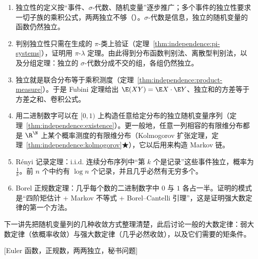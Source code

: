
\begin{enumerate}
\item 独立性的定义按“事件、$\sigma$-代数、随机变量”逐步推广；多个事件的独立性要求一切子族的乘积公式，两两独立不够（）。$\sigma$-代数是信息，独立的随机变量的函数仍然独立。
\item 判别独立性只需在生成的 $\pi$-类上验证（定理~\ref{thm:independence:pi-systems}），证明用 $\pi$-$\lambda$ 定理。由此得到分布函数判别法、离散型判别法，以及分组定理：独立的 $\sigma$-代数分成不交的组，各组仍然独立。
\item 独立就是联合分布等于乘积测度（定理~\ref{thm:independence:product-measure}）。于是 Fubini 定理给出 $\E(XY)=\E X\cdot \E Y$、独立和的方差等于方差之和、卷积公式。
\item 用二进制数字可以在 $[0,1)$ 上构造任意给定分布的独立随机变量序列（定理~\ref{thm:independence:existence}）。更一般地，任意一列相容的有限维分布都是 $\R^\N$ 上某个概率测度的有限维分布（Kolmogorov 扩张定理，定理~\ref{thm:independence:kolmogorov}★），它以后用来构造 Markov 链。
\item Rényi 记录定理：i.i.d. 连续分布序列中“第 $k$ 个是记录”这些事件独立，概率为 $\frac1k$。前 $n$ 个中约有 $\log n$ 个记录，并且几乎必然有无穷多个。
\item Borel 正规数定理：几乎每个数的二进制数字中 $0$ 与 $1$ 各占一半。证明的模式是“四阶矩估计 + Markov 不等式 + Borel--Cantelli 引理”，这是证明强大数定律的第一个方法。
\end{enumerate}
下一讲先把随机变量列的几种收敛方式整理清楚，此后讨论一般的大数定律：弱大数定律（依概率收敛）与强大数定律（几乎必然收敛），以及它们需要的矩条件。

[Euler 函数，正规数，两两独立，秘书问题]
\label{hw:independence}


